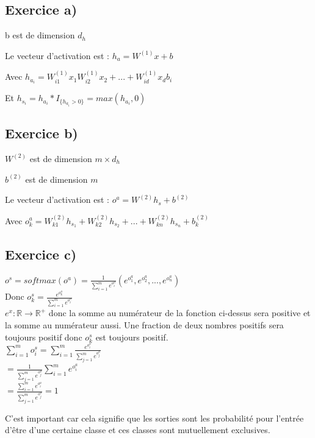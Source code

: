 \documentclass[a4paper,10pt]{article}
\begin{document}
\subsection{Exercice a)}

b est de dimension $d_{h}$

Le vecteur d'activation est : $h_{a} = W^{(1)}x +b$

Avec $ h_{a_i} = W^{(1)}_{i1} x_{1}  W^{(1)}_{i2} x_{2} + ... + W^{(1)}_{id} x_{d} b_{i}$

Et $h_{s_i} = h_{a_i}*I_{ \{ h_{a_i} > 0 \} } = max(h_{a_i}, 0)$

\subsection{Exercice b)}

$W^{(2)}$ est de dimension $m \times d_{h}$

$b^{(2)}$ est de dimension $m$

Le vecteur d'activation est : $o^{a} = W^{(2)} h_{s} + b^{(2)}$

Avec $o^{a}_{k} = W^{(2)}_{k1} h_{s_1} + W^{(2)}_{k2} h_{s_2} + ... + W^{(2)}_{kn} h_{s_n} + b^{(2)}_{k}$

\subsection{Exercice c)}

$o^{s} = softmax(o^{a}) = \frac{1}{\sum_{i=1}^{m} e^{o^{a}_{i}}}  (e^{o^{a}_{1}}, e^{o^{a}_{2}}, ..., e^{o^{a}_{n}})$
\\[6pt]
Donc $o^{s}_{k} = \frac{e^{o^{a}_{k}}}{\sum_{i=1}^{m} e^{o^{a}_{i}}}$
\\[6pt]
$e^{x} : \mathds{R} \rightarrow \mathds{R}^{+}$ donc la somme au numérateur de la fonction ci-dessus sera positive et la somme au numérateur aussi. Une fraction de deux nombres positifs sera toujours positif donc $o^{s}_{k}$ est toujours positif.
\\[6pt]
$\sum^{m}_{i=1} o^{s}_{i} = \sum^{m}_{i=1} \frac{e^{o^{a}_{i}}}{\sum_{j=1}^{m} e^{o^{a}_{j}}}$
\\[6pt]
$ = \frac{1}{\sum_{j=1}^{m} e^{o^{a}_{j}}} \sum^{m}_{i=1} e^{o^{a}_{i}}$
\\[6pt]
$ = \frac{\sum^{m}_{i=1} e^{o^{a}_{i}}}{\sum_{j=1}^{m} e^{o^{a}_{j}}}=1$


C'est important car cela signifie que les sorties sont les probabilité pour l'entrée d'être d'une certaine classe et ces classes sont mutuellement exclusives.
\end{document}
